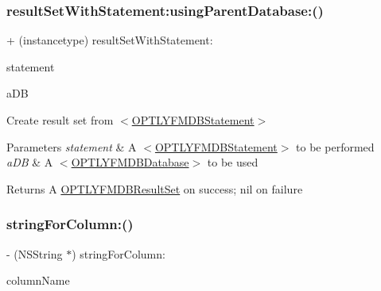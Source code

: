 \subsubsection{\texorpdfstring{result\+Set\+With\+Statement\+:using\+Parent\+Database\+:()}{resultSetWithStatement:usingParentDatabase:()}}
{\footnotesize\ttfamily + (instancetype) result\+Set\+With\+Statement\+: \begin{DoxyParamCaption}\item[{(\mbox{\hyperlink{interface_o_p_t_l_y_f_m_d_b_statement}{O\+P\+T\+L\+Y\+F\+M\+D\+B\+Statement}} $\ast$)}]{statement }\item[{usingParentDatabase:(\mbox{\hyperlink{interface_o_p_t_l_y_f_m_d_b_database}{O\+P\+T\+L\+Y\+F\+M\+D\+B\+Database}}$\ast$)}]{a\+DB }\end{DoxyParamCaption}}

Create result set from {\ttfamily $<$\mbox{\hyperlink{interface_o_p_t_l_y_f_m_d_b_statement}{O\+P\+T\+L\+Y\+F\+M\+D\+B\+Statement}}$>$}


\begin{DoxyParams}{Parameters}
{\em statement} & A {\ttfamily $<$\mbox{\hyperlink{interface_o_p_t_l_y_f_m_d_b_statement}{O\+P\+T\+L\+Y\+F\+M\+D\+B\+Statement}}$>$} to be performed\\
\hline
{\em a\+DB} & A {\ttfamily $<$\mbox{\hyperlink{interface_o_p_t_l_y_f_m_d_b_database}{O\+P\+T\+L\+Y\+F\+M\+D\+B\+Database}}$>$} to be used\\
\hline
\end{DoxyParams}
\begin{DoxyReturn}{Returns}
A {\ttfamily \mbox{\hyperlink{interface_o_p_t_l_y_f_m_d_b_result_set}{O\+P\+T\+L\+Y\+F\+M\+D\+B\+Result\+Set}}} on success; {\ttfamily nil} on failure 
\end{DoxyReturn}
\mbox{\label{interface_o_p_t_l_y_f_m_d_b_result_set_a809b02921be458f48d375b5c1cb0a39e}} 
\subsubsection{\texorpdfstring{string\+For\+Column\+:()}{stringForColumn:()}}
{\footnotesize\ttfamily -\/ (N\+S\+String $\ast$) string\+For\+Column\+: \begin{DoxyParamCaption}\item[{(N\+S\+String$\ast$)}]{column\+Name }\end{DoxyParamCaption}}

